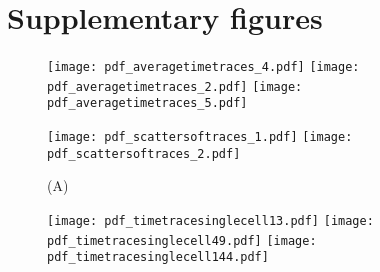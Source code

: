 
\section*{Supplementary figures}


\begin{figure}%
	\centering
	\texttt{[image: pdf\_averagetimetraces\_4.pdf]}
	\texttt{[image: pdf\_averagetimetraces\_2.pdf]}
	\texttt{[image: pdf\_averagetimetraces\_5.pdf]}
	\clearpage %
	\label{fig:XXX:XXX}
\end{figure}	

\clearpage



\begin{figure}%
	\centering
	\texttt{[image: pdf\_scattersoftraces\_1.pdf]}
	\texttt{[image: pdf\_scattersoftraces\_2.pdf]}	
	\caption{ 
		(A) 
	}
	\label{fig:CRP:XXX}
\end{figure}%

\begin{figure}%
	\centering
	\texttt{[image: pdf\_timetracesinglecell13.pdf]}
	\texttt{[image: pdf\_timetracesinglecell49.pdf]}
	\texttt{[image: pdf\_timetracesinglecell144.pdf]}
	\clearpage %
	\label{fig:XXX:XXX}
\end{figure}	

\clearpage

